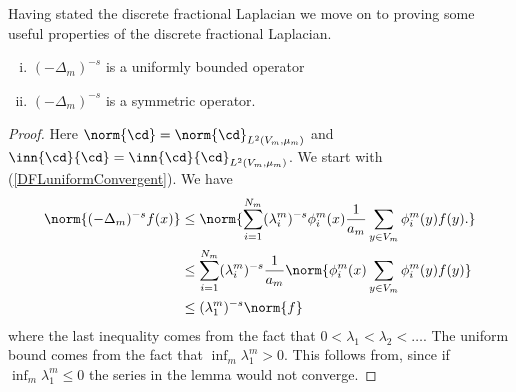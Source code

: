 Having stated the discrete fractional Laplacian we move on to proving some useful properties of the discrete fractional Laplacian.
\begin{prop}\label{discreteFractionalLaplacianProperties}\phantom{a}
	\begin{enumerate}[(i)]
			\item $(-\Delta_{m})^{-s}$ is a uniformly bounded operator \label{DFLuniformConvergent}
			\item $(-\Delta_{m})^{-s}$ is a symmetric operator. \label{DFLsymmetric}
	\end{enumerate}

\end{prop}
\begin{proof}
	Here $\norm{\cd} = \norm{\cd}_{L^2(V_m, \mu_m)}$ and $\inn{\cd}{\cd} = \inn{\cd}{\cd}_{L^2(V_m, \mu_m)}$. We start with (\ref{DFLuniformConvergent}). We have
	\begin{align}
		\norm{(-\Delta_m)^{-s}f(x)} &\leq \norm{\sum_{i = 1}^{N_m} (\lambda_{i}^{m})^{-s} \phi_{i}^{m}(x) \frac{1}{a_m} \sum_{y \in V_m} \phi_{i}^{m}(y)f(y).} \\
		& \leq \sum_{i = 1}^{N_m} (\lambda_{i}^{m})^{-s} \frac{1}{a_m}\norm{\phi_{i}^{m}(x)\sum_{y \in V_m} \phi_{i}^{m}(y)f(y)} \\
		& \leq (\lambda_1^{m})^{-s} \norm{f}
	\end{align}
	where the last inequality comes from the fact that $0 < \lambda_1 < \lambda_{2} < \ldots$. The uniform bound comes from the fact that $\inf_{m} \lambda_{1}^{m} > 0$. This follows from\cite[lemma 5.2]{specAnal}, since if $\inf_{m} \lambda_{1}^{m} \leq 0$ the series in the lemma would not converge.
	

\end{proof}
